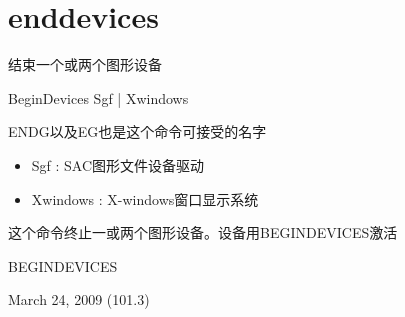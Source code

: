 \section{enddevices}
\label{cmd:enddevices}

结束一个或两个图形设备

BeginDevices Sgf | Xwindows

ENDG以及EG也是这个命令可接受的名字

\begin{itemize}
\item Sgf : SAC图形文件设备驱动
\item Xwindows : X-windows窗口显示系统
\end{itemize}

这个命令终止一或两个图形设备。设备用BEGINDEVICES激活

BEGINDEVICES

March 24, 2009 (101.3)
